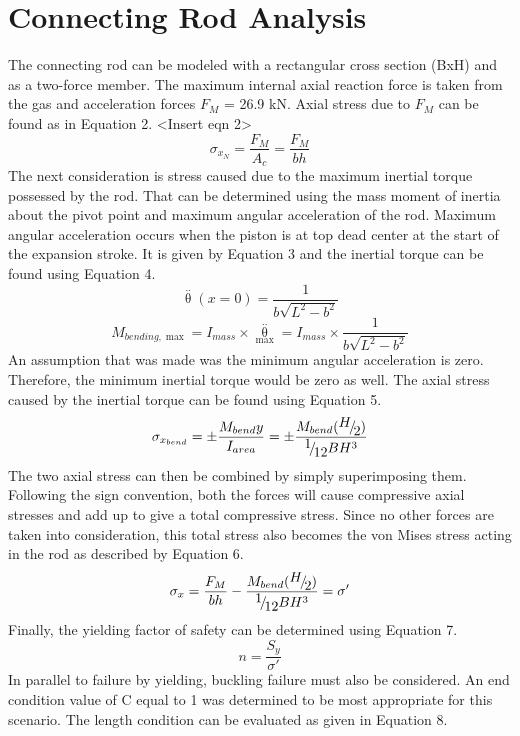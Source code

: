 \documentclass[10pt,a4paper]{article}
\begin{document}
\section*{Connecting Rod Analysis}
The connecting rod can be modeled with a rectangular cross section (BxH) and as a two-force member. The maximum internal axial reaction force is taken from the gas and acceleration forces $F_M$ = 26.9 kN.
Axial stress due to $F_M$ can be found as in Equation 2.
<Insert eqn 2>
\[{\sigma _{{x_N}}} = \frac{F_M}{{{A_c}}} = \frac{F_M}{b h}\]
The next consideration is stress caused due to the maximum inertial torque possessed by the rod. That can be determined using the mass moment of inertia about the pivot point and maximum angular acceleration of the rod. Maximum angular acceleration occurs when the piston is at top dead center at the start of the expansion stroke. It is given by Equation 3 and the inertial torque can be found using Equation 4.
\[\mathop \theta \limits^{..} (x = 0) = \frac{1}{{b\sqrt {{L^2} - {b^2}} }}\]
\[{M_{bending,\max }} = {I_{mass}} \times {\mathop \theta \limits^{..} _{\max }} = {I_{mass}} \times \frac{1}{{b\sqrt {{L^2} - {b^2}} }}\]
An assumption that was made was the minimum angular acceleration is zero. Therefore, the minimum inertial torque would be zero as well. The axial stress caused by the inertial torque can be found using Equation 5.
\[{\sigma _{{x_{bend}}}} =  \pm \frac{{{M_{bend}}y}}{{{I_{area}}}} =  \pm \frac{{{M_{bend}}({\raise0.7ex\hbox{$H$} \!\mathord{\left/
 {\vphantom {H 2}}\right.\kern-\nulldelimiterspace}
\!\lower0.7ex\hbox{$2$}})}}{{{\raise0.7ex\hbox{$1$} \!\mathord{\left/
 {\vphantom {1 {12}}}\right.\kern-\nulldelimiterspace}
\!\lower0.7ex\hbox{${12}$}}B{H^3}}}\]
The two axial stress can then be combined by simply superimposing them. Following the sign convention, both the forces will cause compressive axial stresses and add up to give a total compressive stress. Since no other forces are taken into consideration, this total stress also becomes the von Mises stress acting in the rod as described by Equation 6.
\[{\sigma _x} = \frac{F_M}{b h} - \frac{{{M_{bend}}({\raise0.7ex\hbox{$H$} \!\mathord{\left/
 {\vphantom {H 2}}\right.\kern-\nulldelimiterspace}
\!\lower0.7ex\hbox{$2$}})}}{{{\raise0.7ex\hbox{$1$} \!\mathord{\left/
 {\vphantom {1 {12}}}\right.\kern-\nulldelimiterspace}
\!\lower0.7ex\hbox{${12}$}}B{H^3}}} = \sigma '\]
Finally, the yielding factor of safety can be determined using Equation 7.
\[n = \frac{{{S_y}}}{{\sigma '}}\]
In parallel to failure by yielding, buckling failure must also be considered. An end condition value of C equal to 1 was determined to be most appropriate for this scenario. The length condition can be evaluated as given in Equation 8.
\end{document}
